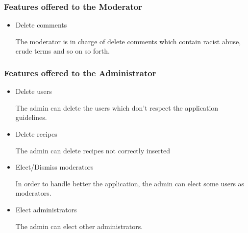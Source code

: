 \documentclass[a4paper]{report}
\begin{document}
\subsubsection{Features offered to the Moderator}
\begin{itemize}
	\item Delete comments
	
	\noindent The moderator is in charge of delete comments which contain racist abuse, crude terms and so on so forth.
\end{itemize}

\subsubsection{Features offered to the Administrator}
\begin{itemize}
	\item Delete users
	
	\noindent The admin can delete the users which don't respect the application guidelines.
	
	\item Delete recipes
	
	\noindent The admin can delete recipes not correctly inserted
	
	\item Elect/Dismiss moderators
	
	\noindent In order to handle better the application, the admin can elect some users as moderators.
	
	\item Elect administrators
	
	\noindent The admin can elect other administrators.
\end{itemize}
\end{document}
